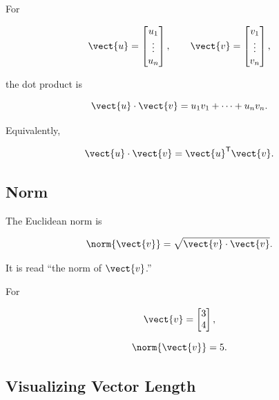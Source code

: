 For

\[ \vect{u}=\begin{bmatrix}u_1\\\vdots\\u_n\end{bmatrix},
\qquad
\vect{v}=\begin{bmatrix}v_1\\\vdots\\v_n\end{bmatrix}, \]

the dot product is

\[ \vect{u}\cdot\vect{v}
=u_1v_1+\cdots+u_nv_n. \]

Equivalently,

\[ \vect{u}\cdot\vect{v}=\vect{u}^{\mathsf T}\vect{v}. \]

\subsection{Norm}
\label{subsec:vector-norm}

The Euclidean norm is

\[ \norm{\vect{v}}=\sqrt{\vect{v}\cdot\vect{v}}. \]

It is read ``the norm of \(\vect{v}\).''

For

\[ \vect{v}=\begin{bmatrix}3\\4\end{bmatrix}, \]

\[ \norm{\vect{v}}=5. \]

\subsection{Visualizing Vector Length}
\label{subsec:visual-vector-length}

\begin{center}
\end{center}

